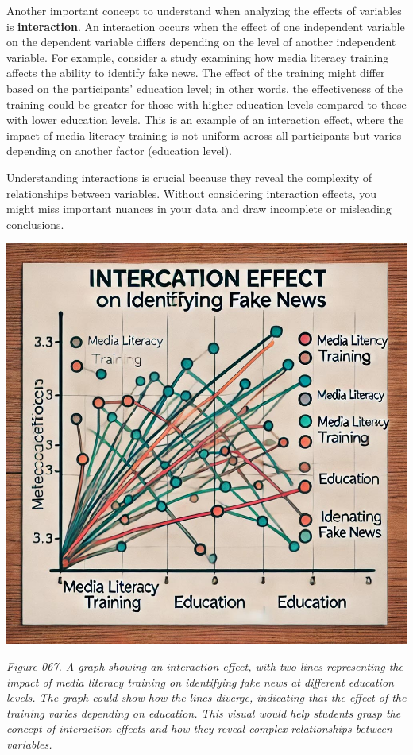 \documentclass[
]{book}
\begin{document}
Another important concept to understand when analyzing the effects of variables is \textbf{interaction}. An interaction occurs when the effect of one independent variable on the dependent variable differs depending on the level of another independent variable. For example, consider a study examining how media literacy training affects the ability to identify fake news. The effect of the training might differ based on the participants' education level; in other words, the effectiveness of the training could be greater for those with higher education levels compared to those with lower education levels. This is an example of an interaction effect, where the impact of media literacy training is not uniform across all participants but varies depending on another factor (education level).

Understanding interactions is crucial because they reveal the complexity of relationships between variables. Without considering interaction effects, you might miss important nuances in your data and draw incomplete or misleading conclusions.

\includegraphics[width=1\textwidth,height=\textheight]{images/fig067.jpg}

\emph{Figure 067. A graph showing an interaction effect, with two lines representing the impact of media literacy training on identifying fake news at different education levels. The graph could show how the lines diverge, indicating that the effect of the training varies depending on education. This visual would help students grasp the concept of interaction effects and how they reveal complex relationships between variables.}
\end{document}
